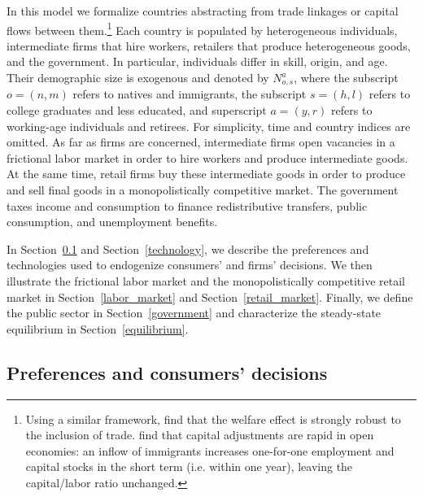 \documentclass[a4paper,12pt]{article}
\begin{document}
In this model we formalize countries abstracting from trade linkages or capital flows between them.\footnote{Using a similar framework, \citet{Aubry2016} find that the welfare effect is strongly robust to the inclusion of trade. \citet{Ortega2014} find that capital adjustments are rapid in open economies: an inflow of immigrants increases one-for-one employment and capital stocks in the short
term (i.e. within one year), leaving the capital/labor ratio unchanged.} Each country is populated by heterogeneous individuals, intermediate firms that hire workers, retailers that produce heterogeneous goods, and the government. In particular, individuals differ in skill, origin, and age. Their demographic size is exogenous and denoted by $N_{o,s}^{a}$, where the subscript $o=(n,m)$ refers to natives and immigrants, the subscript $s=(h,l)$ refers to college graduates and less educated, and superscript $a=(y,r)$ refers to working-age individuals and retirees. For simplicity, time and country indices are omitted. As far as firms are concerned, intermediate firms open vacancies in a frictional labor market in order to hire workers and produce intermediate goods. At the same time, retail firms buy these intermediate goods in order to produce and sell final goods in a monopolistically competitive market. The government taxes income and consumption to finance redistributive transfers, public consumption, and
unemployment benefits.

In Section~\ref{preferences} and Section~\ref{technology}, we describe the preferences and technologies
used to endogenize consumers' and firms' decisions. We then illustrate the
frictional labor market and the monopolistically competitive retail market
in Section~\ref{labor_market} and Section~\ref{retail_market}. Finally, we define the public sector in Section~\ref{government} and characterize the steady-state equilibrium in Section~\ref{equilibrium}.

\subsection{Preferences and consumers' decisions} \label{preferences}
\end{document}
